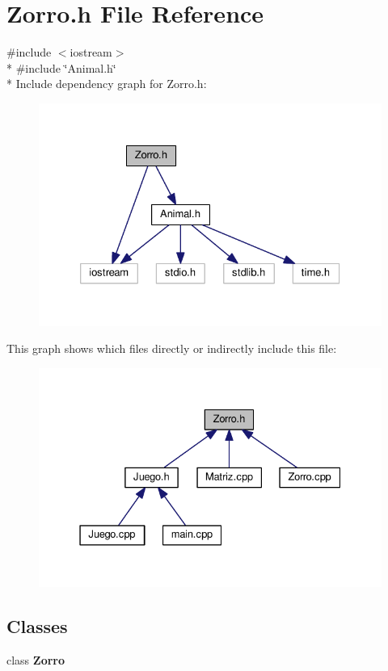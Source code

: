 \section{Zorro.\-h File Reference}
\label{_zorro_8h}
{\ttfamily \#include $<$iostream$>$}\\*
{\ttfamily \#include \char`\"{}Animal.\-h\char`\"{}}\\*
Include dependency graph for Zorro.\-h\-:
\nopagebreak
\begin{figure}[H]
\begin{center}
\leavevmode
\includegraphics[width=326pt]{_zorro_8h__incl}
\end{center}
\end{figure}
This graph shows which files directly or indirectly include this file\-:
\nopagebreak
\begin{figure}[H]
\begin{center}
\leavevmode
\includegraphics[width=331pt]{_zorro_8h__dep__incl}
\end{center}
\end{figure}
\subsection*{Classes}
\begin{DoxyCompactItemize}
\item 
class {\bf Zorro}
\end{DoxyCompactItemize}
